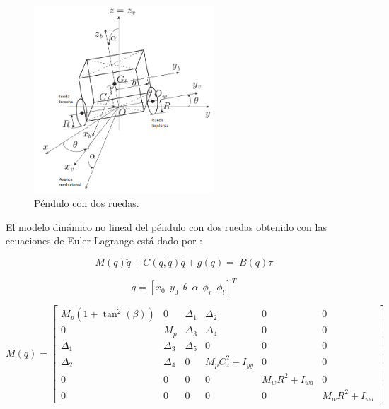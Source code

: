 \documentclass[11pt, twoside]{book}     %
\begin{document}
            \begin{figure}[H]
                \centering
                \includegraphics[width=0.6\textwidth]{Recursos/Imagenes/Fundamentacion_teorica/Diagrama_modelo_dinamico.png}
                \caption{Péndulo con dos ruedas.} 
                \label{Figura1}
            \end{figure}
    
            El modelo dinámico no lineal del péndulo con dos ruedas obtenido con las ecuaciones de Euler-Lagrange está dado por \citep{VMHGuzmancontrol2013}:
    
            \begin{equation}
                M(q)\ddot{q}+C(q,\dot{q})\dot{q}+g(q)= \ B(q)\tau
                \label{eq:formula1}
            \end{equation}
    
            \begin{equation}
                q=[x_0 \ \ y_0 \ \ \theta \ \ \alpha \ \ \phi_r \ \ \phi_l]^{T}
            \end{equation}
    
            \begin{equation}	
                M(q) =
                \begin{bmatrix}
                    M_p(1 + \tan^2(\beta)) & 0 & \Delta_1 & \Delta_2 & 0 & 0 \\
                    0 & M_p & \Delta_3 & \Delta_4 & 0 & 0 \\
                    \Delta_1 & \Delta_3 & \Delta_5 & 0 & 0 & 0 \\
                    \Delta_2 & \Delta_4 & 0 & M_p C_z^2 + I_{yy} & 0 & 0 \\
                    0 & 0 & 0 & 0 & M_w R^2 + I_{wa} & 0 \\
                    0 & 0 & 0 & 0 & 0 & M_w R^2 + I_{wa}
                \end{bmatrix}
            \end{equation}
\end{document}
